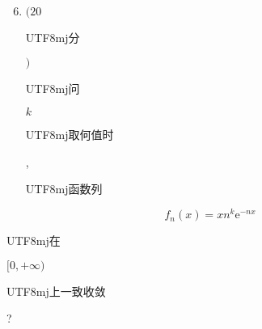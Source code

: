 \documentclass[10pt]{article}
\begin{document}
\begin{enumerate}
  \setcounter{enumi}{5}
  \item $(20$ \begin{CJK}{UTF8}{mj}分\end{CJK} $)$ \begin{CJK}{UTF8}{mj}问\end{CJK} $k$ \begin{CJK}{UTF8}{mj}取何值时\end{CJK}, \begin{CJK}{UTF8}{mj}函数列\end{CJK}
\end{enumerate}
$$
f_{n}(x)=x n^{k} \mathrm{e}^{-n x}
$$
\begin{CJK}{UTF8}{mj}在\end{CJK} $[0,+\infty)$ \begin{CJK}{UTF8}{mj}上一致收敛\end{CJK}?
\end{document}
